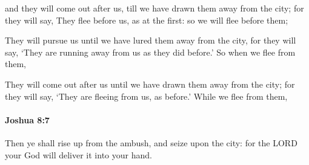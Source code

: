 			\begin{versebox}
					\item[BHS] 
					\item[ASV] and they will come out after us, till we have drawn them away from the city; for they will say, They flee before us, as at the first: so we will flee before them;
					\item[NIV] They will pursue us until we have lured them away from the city, for they will say, ‘They are running away from us as they did before.’ So when we flee from them,
					\item[NRSV] They will come out after us until we have drawn them away from the city; for they will say, ‘They are fleeing from us, as before.’ While we flee from them,
			\end{versebox}

		\paragraph{Joshua 8:7} %
			\label{JOSHUA-8-7}

			Then ye shall rise up from the ambush, and seize upon the city: for the LORD your God will deliver it into your hand.

